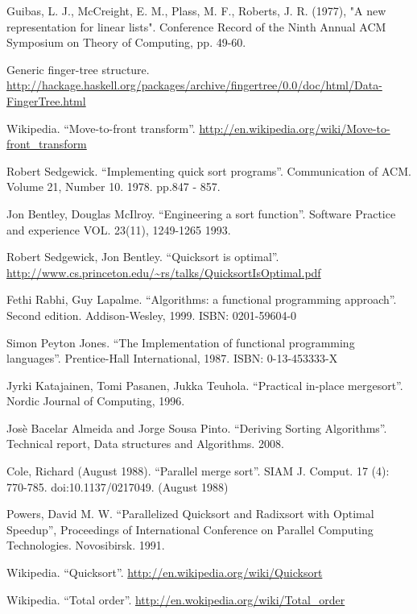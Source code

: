 \begin{thebibliography}{99}
Guibas, L. J., McCreight, E. M., Plass, M. F., Roberts, J. R. (1977), "A new representation for linear lists". Conference Record of the Ninth Annual ACM Symposium on Theory of Computing, pp. 49-60.

Generic finger-tree structure. \url{http://hackage.haskell.org/packages/archive/fingertree/0.0/doc/html/Data-FingerTree.html}

Wikipedia. ``Move-to-front transform''. \url{http://en.wikipedia.org/wiki/Move-to-front_transform}


Robert Sedgewick. ``Implementing quick sort programs''. Communication of ACM. Volume 21, Number 10. 1978. pp.847 - 857.

Jon Bentley, Douglas McIlroy. ``Engineering a sort function''. Software Practice and experience VOL. 23(11), 1249-1265 1993.

Robert Sedgewick, Jon Bentley. ``Quicksort is optimal''. \url{http://www.cs.princeton.edu/~rs/talks/QuicksortIsOptimal.pdf}

Fethi Rabhi, Guy Lapalme. ``Algorithms: a functional programming approach''. Second edition. Addison-Wesley, 1999. ISBN: 0201-59604-0

Simon Peyton Jones. ``The Implementation of functional programming languages''. Prentice-Hall International, 1987. ISBN: 0-13-453333-X

Jyrki Katajainen, Tomi Pasanen, Jukka Teuhola. ``Practical in-place mergesort''. Nordic Journal of Computing, 1996.

Jos\`{e} Bacelar Almeida and Jorge Sousa Pinto. ``Deriving Sorting Algorithms''. Technical report, Data structures and Algorithms. 2008.

Cole, Richard (August 1988). ``Parallel merge sort''. SIAM J. Comput. 17 (4): 770-785. doi:10.1137/0217049. (August 1988)

Powers, David M. W. ``Parallelized Quicksort and Radixsort with Optimal Speedup'', Proceedings of International Conference on Parallel Computing Technologies. Novosibirsk. 1991.

Wikipedia. ``Quicksort''. \url{http://en.wikipedia.org/wiki/Quicksort}

Wikipedia. ``Total order''. \url{http://en.wokipedia.org/wiki/Total_order}


\end{thebibliography}
